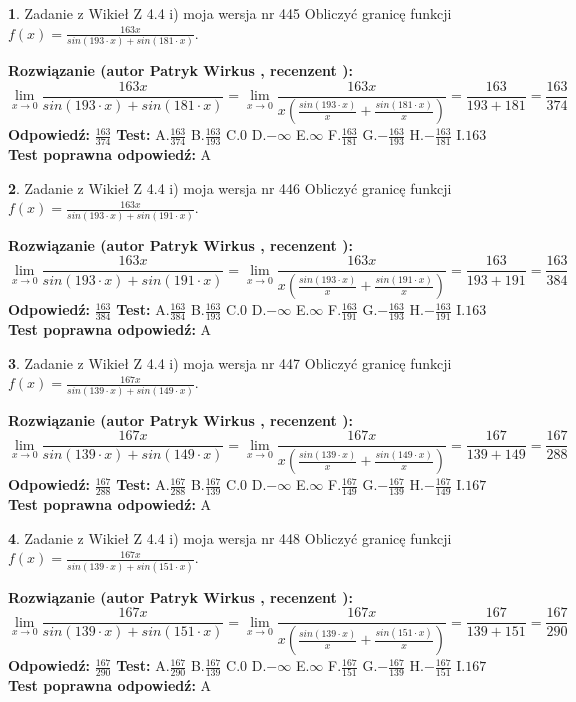 \documentclass[12pt, a4paper]{article}
\theoremstyle{definition} %
\newtheorem{zad}{}
\newcommand{\zadStart}[1]{\begin{zad}#1\newline}
\newcommand{\zadStop}{\end{zad}}
\newcommand{\rozwStart}[2]{\noindent \textbf{Rozwiązanie (autor #1 , recenzent #2): }\newline}
\newcommand{\rozwStop}{\newline}
\newcommand{\odpStart}{\noindent \textbf{Odpowiedź:}\newline}
\newcommand{\odpStop}{\newline}
\newcommand{\testStart}{\noindent \textbf{Test:}\newline}
\newcommand{\testStop}{\newline}
\newcommand{\kluczStart}{\noindent \textbf{Test poprawna odpowiedź:}\newline}
\newcommand{\kluczStop}{\newline}
\begin{document}
\zadStart{Zadanie z Wikieł Z 4.4 i) moja wersja nr 445}
Obliczyć granicę funkcji $f(x)=\frac{163x}{sin(193\cdot x) +sin(181\cdot x)}$.
\zadStop
\rozwStart{Patryk Wirkus}{}
$$\lim\limits_{x\to 0}\frac{163x}{sin(193\cdot x) +sin(181\cdot x)}=\lim\limits_{x\to 0}\frac{163x}{x(\frac{sin(193\cdot x)}{x}+\frac{sin(181\cdot x)}{x})}=\frac{163}{193+181} = \frac{163}{374}$$
\rozwStop
\odpStart
$\frac{163}{374}$
\odpStop
\testStart
A.$\frac{163}{374}$
B.$\frac{163}{193}$
C.$0$
D.$-\infty$
E.$\infty$
F.$\frac{163}{181}$
G.$-\frac{163}{193}$
H.$-\frac{163}{181}$
I.$163$
\testStop
\kluczStart
A
\kluczStop



\zadStart{Zadanie z Wikieł Z 4.4 i) moja wersja nr 446}
Obliczyć granicę funkcji $f(x)=\frac{163x}{sin(193\cdot x) +sin(191\cdot x)}$.
\zadStop
\rozwStart{Patryk Wirkus}{}
$$\lim\limits_{x\to 0}\frac{163x}{sin(193\cdot x) +sin(191\cdot x)}=\lim\limits_{x\to 0}\frac{163x}{x(\frac{sin(193\cdot x)}{x}+\frac{sin(191\cdot x)}{x})}=\frac{163}{193+191} = \frac{163}{384}$$
\rozwStop
\odpStart
$\frac{163}{384}$
\odpStop
\testStart
A.$\frac{163}{384}$
B.$\frac{163}{193}$
C.$0$
D.$-\infty$
E.$\infty$
F.$\frac{163}{191}$
G.$-\frac{163}{193}$
H.$-\frac{163}{191}$
I.$163$
\testStop
\kluczStart
A
\kluczStop



\zadStart{Zadanie z Wikieł Z 4.4 i) moja wersja nr 447}
Obliczyć granicę funkcji $f(x)=\frac{167x}{sin(139\cdot x) +sin(149\cdot x)}$.
\zadStop
\rozwStart{Patryk Wirkus}{}
$$\lim\limits_{x\to 0}\frac{167x}{sin(139\cdot x) +sin(149\cdot x)}=\lim\limits_{x\to 0}\frac{167x}{x(\frac{sin(139\cdot x)}{x}+\frac{sin(149\cdot x)}{x})}=\frac{167}{139+149} = \frac{167}{288}$$
\rozwStop
\odpStart
$\frac{167}{288}$
\odpStop
\testStart
A.$\frac{167}{288}$
B.$\frac{167}{139}$
C.$0$
D.$-\infty$
E.$\infty$
F.$\frac{167}{149}$
G.$-\frac{167}{139}$
H.$-\frac{167}{149}$
I.$167$
\testStop
\kluczStart
A
\kluczStop



\zadStart{Zadanie z Wikieł Z 4.4 i) moja wersja nr 448}
Obliczyć granicę funkcji $f(x)=\frac{167x}{sin(139\cdot x) +sin(151\cdot x)}$.
\zadStop
\rozwStart{Patryk Wirkus}{}
$$\lim\limits_{x\to 0}\frac{167x}{sin(139\cdot x) +sin(151\cdot x)}=\lim\limits_{x\to 0}\frac{167x}{x(\frac{sin(139\cdot x)}{x}+\frac{sin(151\cdot x)}{x})}=\frac{167}{139+151} = \frac{167}{290}$$
\rozwStop
\odpStart
$\frac{167}{290}$
\odpStop
\testStart
A.$\frac{167}{290}$
B.$\frac{167}{139}$
C.$0$
D.$-\infty$
E.$\infty$
F.$\frac{167}{151}$
G.$-\frac{167}{139}$
H.$-\frac{167}{151}$
I.$167$
\testStop
\kluczStart
A
\kluczStop
\end{document}

